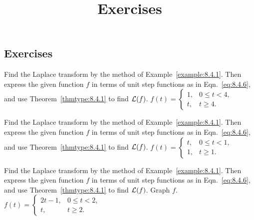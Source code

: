 \documentclass{ximera}
\title{Exercises} \license{CC BY-NC-SA 4.0}
\begin{document}
\begin{abstract}
\end{abstract}
\maketitle

\begin{onlineOnly}
\section*{Exercises}
\end{onlineOnly}

\begin{problem}\label{exer:8.4.1} 
Find the Laplace transform by
the method of Example~\ref{example:8.4.1}. Then express the given function
$f$ in terms of unit step functions as in Eqn.~\eqref{eq:8.4.6}, and use
Theorem~\ref{thmtype:8.4.1} to find ${\cal L}(f)$.
$f(t)=\left\{\begin{array}{cl} 1,&0
\le t<4,\\ t,&t\ge4.\end{array}\right.$
\end{problem}

\begin{problem}\label{exer:8.4.2} 
Find the Laplace transform by
the method of Example~\ref{example:8.4.1}. Then express the given function
$f$ in terms of unit step functions as in Eqn.~\eqref{eq:8.4.6}, and use
Theorem~\ref{thmtype:8.4.1} to find ${\cal L}(f)$.
$f(t)=\left\{\begin{array}{cl} t,&0
\le t<1,\\ 1,&t\ge1.\end{array}\right.$
\end{problem}

\begin{problem}\label{exer:8.4.3} 
Find the Laplace transform by
the method of Example~\ref{example:8.4.1}. Then express the given function
$f$ in terms of unit step functions as in Eqn.~\eqref{eq:8.4.6}, and use
Theorem~\ref{thmtype:8.4.1} to find ${\cal L}(f)$.  Graph $f$.
$f(t)=\left\{\begin{array}{cl} 2t-1,&
0\le t<2,\\  t,&t\ge2.\end{array}\right.$
\end{problem}
\end{document}

